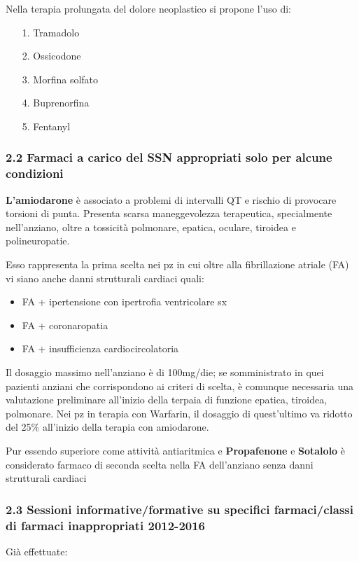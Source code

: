   Nella terapia prolungata del dolore neoplastico si propone l'uso di:

\begin{itemize}
\item[1.]
  Tramadolo
\item[2.]
  Ossicodone
\item[3.]
  Morfina solfato
\item[4.]
  Buprenorfina
\item[5.]
  Fentanyl
\end{itemize}

  \subsubsection{2.2 Farmaci a carico del SSN appropriati solo per alcune condizioni}

  \textbf{L'amiodarone} è associato a problemi di intervalli QT e
  rischio di provocare torsioni di punta. Presenta scarsa maneggevolezza
  terapeutica, specialmente nell'anziano, oltre a tossicità polmonare,
  epatica, oculare, tiroidea e polineuropatie.

  Esso rappresenta la prima scelta nei pz in cui oltre alla
  fibrillazione atriale (FA) vi siano anche danni strutturali cardiaci
  quali:

\begin{itemize}
\item
  FA + ipertensione con ipertrofia ventricolare sx
\item
  FA + coronaropatia
\item
  FA + insufficienza cardiocircolatoria
\end{itemize}

  Il dosaggio massimo nell'anziano è di 100mg/die; se somministrato in
  quei pazienti anziani che corrispondono ai criteri di scelta, è
  comunque necessaria una valutazione preliminare all'inizio della
  terpaia di funzione epatica, tiroidea, polmonare. Nei pz in terapia
  con Warfarin, il dosaggio di quest'ultimo va ridotto del 25\%
  all'inizio della terapia con amiodarone.

  Pur essendo superiore come attività antiaritmica e
  \textbf{Propafenone} e \textbf{Sotalolo} è considerato farmaco di
  seconda scelta nella FA dell'anziano senza danni strutturali cardiaci

  \subsubsection{2.3 Sessioni informative/formative su specifici farmaci/classi di farmaci inappropriati 2012-2016}
  Già effettuate:
  
